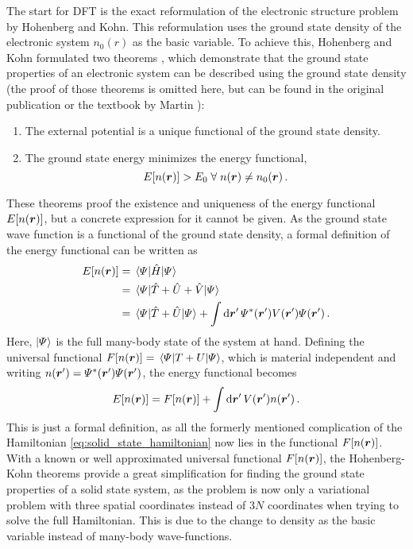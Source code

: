 \documentclass[main.tex]{subfiles}
\begin{document}
The start for DFT is the exact reformulation of the electronic structure problem by Hohenberg and Kohn.
This reformulation uses the ground state density of the electronic system \(n_0 (r)\) as the basic variable.
To achieve this, Hohenberg and Kohn formulated two theorems \cite{hohenberg_inhomogeneous_1964}, which demonstrate that the ground state properties of an electronic system can be described using the ground state density (the proof of those theorems is omitted here, but can be found in the original publication \cite{hohenberg_inhomogeneous_1964} or the textbook by Martin \cite[chapter 6.2]{martin_electronic_2004}):
\begin{enumerate}[I]
    \item The external potential is a unique functional of the ground state density.
    \item The ground state energy minimizes the energy functional,
    \[E[n(\vb*{r})] > E_0 \;\forall\; n(\vb*{r}) \neq n_0 (\vb*{r})\,.\]
\end{enumerate}
These theorems proof the existence and uniqueness of the energy functional \(E[n(\vb*{r})]\), but a concrete expression for it cannot be given.
As the ground state wave function is a functional of the ground state density, a formal definition of the energy functional can be written as
\begin{align*}
    E[n(\vb*{r})] &= \expval{\hat{H}}{\Psi} \\
    &= \expval{\hat{T} + \hat{U} + \hat{V}}{\Psi} \\
    &= \expval{\hat{T} + \hat{U}}{\Psi} + \int \dd{\vb*{r}^{\prime}} \Psi^* (\vb*{r}^{\prime}) V(\vb*{r}^{\prime}) \Psi (\vb*{r}^{\prime})\,.
\end{align*}
Here, \(\ket{\Psi}\) is the full many-body state of the system at hand.
Defining the universal functional \(F[n(\vb*{r})] = \expval{T + U}{\Psi}\), which is material independent and writing \(n (\vb*{r}^{\prime}) = \Psi^* (\vb*{r}^{\prime}) \Psi (\vb*{r}^{\prime})\), the energy functional becomes
\begin{equation}\label{eq:hohenberg_kohn_energy_functional}
    E[n(\vb*{r})] = F[n(\vb*{r})] + \int \dd{\vb*{r}^{\prime}} V(\vb*{r}^{\prime}) n (\vb*{r}^{\prime})\,.
\end{equation}
This is just a formal definition, as all the formerly mentioned complication of the Hamiltonian \ref{eq:solid_state_hamiltonian} now lies in the functional \(F[n(\vb*{r})]\).
With a known or well approximated universal functional \(F[n(\vb*{r})]\), the Hohenberg-Kohn theorems provide a great simplification for finding the ground state properties of a solid state system, as the problem is now only a variational problem with three spatial coordinates instead of \(3N\) coordinates when trying to solve the full Hamiltonian.
This is due to the change to density as the basic variable instead of many-body wave-functions.
\end{document}
